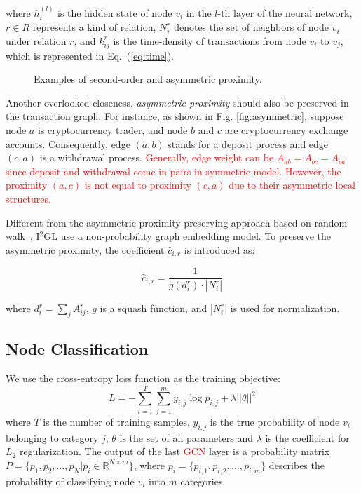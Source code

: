 \noindent where $h_i^{(l)}$ is the hidden state of node $v_i$ in the $l$-th layer of the neural network, $r \in R$ represents a kind of relation, $N_i^r$ denotes the set of neighbors of node $v_i$ under relation $r$, and $k_{ij}^r$ is the time-density of transactions from node $v_i$ to $v_j$, which is represented in Eq.~(\ref{eq:time}).


\begin{figure}[htbp]
	\centering
	\caption{Examples of second-order and asymmetric proximity.}

\end{figure}


Another overlooked closeness, \emph{asymmetric proximity} should also be preserved in the transaction graph. For instance, as shown in Fig. \ref{fig:asymmetric}, suppose node $a$ is cryptocurrency trader, and node $b$ and $c$ are cryptocurrency exchange accounts. Consequently, edge $(a,b)$ stands for a deposit process and edge $(c,a)$ is a withdrawal process. \textcolor{red}{Generally, edge weight can be $A_{ab}=A_{bc}=A_{ca}$ since deposit and withdrawal come in pairs in symmetric model. However, the proximity $(a,c)$ is not equal to proximity $(c,a)$ due to their asymmetric local structures.}

Different from the asymmetric proximity preserving approach based on random walk~\cite{zhou2017scalable}, I$^2$GL use a non-probability graph embedding model. To preserve the asymmetric proximity, the coefficient $\hat c_{i,r}$ is introduced as:

\begin{equation}
\hat c_{i,r}=\frac{1}{g(d_i^r)\cdot |N_i^r|}
\end{equation}

\noindent where $d_i^r=\sum_{j}A^r_{ij}$, $g$ is a squash function, and $|N_i^r|$ is used for normalization.



\subsection{Node Classification}
We use the cross-entropy loss function as the training objective:
\begin{equation}
L=-\sum_{i=1}^T\sum_{j=1}^m y_{i,j}\log p_{i,j}+\lambda ||\theta||^2
\end{equation}
where $T$ is the number of training samples, $y_{i,j}$ is the true probability of node $v_i$ belonging to category $j$, $\theta$ is the set of all parameters and $\lambda$ is the coefficient for $L_2$  regularization. The output of the last \textcolor{red}{GCN} layer is a probability matrix $P=\{p_1,p_2,...,p_N|p_i\in \mathbb{R}^{N \times m}\}$, where $p_i=\{p_{i,1},p_{i,2},...,p_{i,m}\}$ describes the probability of classifying node $v_i$ into $m$ categories. 
